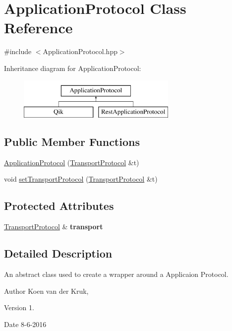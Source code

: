 \hypertarget{class_application_protocol}{}\section{Application\+Protocol Class Reference}
\label{class_application_protocol}


{\ttfamily \#include $<$Application\+Protocol.\+hpp$>$}

Inheritance diagram for Application\+Protocol\+:\begin{figure}[H]
\begin{center}
\leavevmode
\includegraphics[height=2.000000cm]{class_application_protocol}
\end{center}
\end{figure}
\subsection*{Public Member Functions}
\begin{DoxyCompactItemize}
\item 
\hyperlink{class_application_protocol_ae2a832cc8ffb74ede5582471187f2da1}{Application\+Protocol} (\hyperlink{class_transport_protocol}{Transport\+Protocol} \&t)
\item 
void \hyperlink{class_application_protocol_a6005c829686a0040803063aaea9d84ae}{set\+Transport\+Protocol} (\hyperlink{class_transport_protocol}{Transport\+Protocol} \&t)
\end{DoxyCompactItemize}
\subsection*{Protected Attributes}
\begin{DoxyCompactItemize}
\item 
\hypertarget{class_application_protocol_a7e626f0d9d9df956ef38737939a6d1c0}{}\hyperlink{class_transport_protocol}{Transport\+Protocol} \& {\bfseries transport}\label{class_application_protocol_a7e626f0d9d9df956ef38737939a6d1c0}

\end{DoxyCompactItemize}


\subsection{Detailed Description}
An abstract class used to create a wrapper around a Applicaion Protocol. \begin{DoxyAuthor}{Author}
Koen van der Kruk, 
\end{DoxyAuthor}
\begin{DoxyVersion}{Version}
1. 
\end{DoxyVersion}
\begin{DoxyDate}{Date}
8-\/6-\/2016 
\end{DoxyDate}


